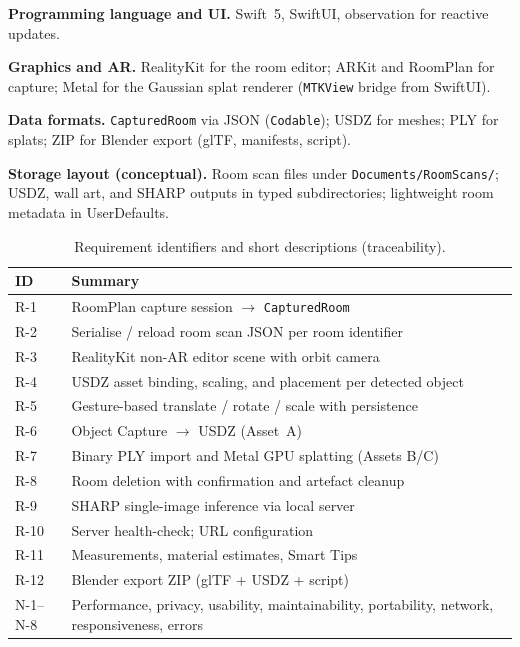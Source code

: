 \textbf{Programming language and UI.} Swift~5, SwiftUI, observation for reactive updates.

\textbf{Graphics and AR.} RealityKit for the room editor; ARKit and RoomPlan for capture; Metal for the Gaussian splat renderer (\texttt{MTKView} bridge from SwiftUI).

\textbf{Data formats.} \texttt{CapturedRoom} via JSON (\texttt{Codable}); USDZ for meshes; PLY for splats; ZIP for Blender export (glTF, manifests, script).

\textbf{Storage layout (conceptual).} Room scan files under \texttt{Documents/RoomScans/}; USDZ, wall art, and SHARP outputs in typed subdirectories; lightweight room metadata in UserDefaults.

\begin{table}[htbp]
\centering
\caption{Requirement identifiers and short descriptions (traceability).}
\label{tab:req_trace}
\setlength{\tabcolsep}{6pt}
\renewcommand{\arraystretch}{1.25}
\begin{tabular}{lp{}}
\toprule
\textbf{ID} & \textbf{Summary} \\
\midrule
\rowcolor{gray!8}
R-1 & RoomPlan capture session $\rightarrow$ \texttt{CapturedRoom} \\
R-2 & Serialise / reload room scan JSON per room identifier \\
\rowcolor{gray!8}
R-3 & RealityKit non-AR editor scene with orbit camera \\
R-4 & USDZ asset binding, scaling, and placement per detected object \\
\rowcolor{gray!8}
R-5 & Gesture-based translate / rotate / scale with persistence \\
R-6 & Object Capture $\rightarrow$ USDZ (Asset~A) \\
\rowcolor{gray!8}
R-7 & Binary PLY import and Metal GPU splatting (Assets B/C) \\
R-8 & Room deletion with confirmation and artefact cleanup \\
\rowcolor{gray!8}
R-9 & SHARP single-image inference via local server \\
R-10 & Server health-check; URL configuration \\
\rowcolor{gray!8}
R-11 & Measurements, material estimates, Smart Tips \\
R-12 & Blender export ZIP (glTF + USDZ + script) \\
\midrule
\rowcolor{gray!8}
N-1--N-8 & Performance, privacy, usability, maintainability, portability, network, responsiveness, errors \\
\bottomrule
\end{tabular}
\end{table}

